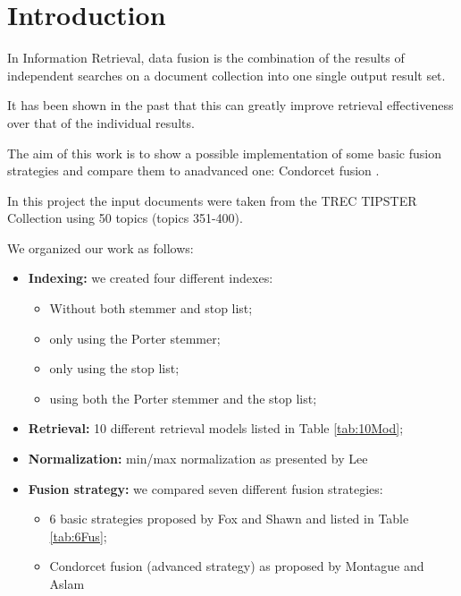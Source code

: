 


    \printTitle
    \newpage
    \tableofcontents
    \newpage

    \section{Introduction}
    
    In Information Retrieval, data fusion is the combination of the results
    of independent searches on a document collection into one single output
    result set.
    
    It has been shown in the past that this can greatly improve retrieval
    effectiveness over that of the individual results.
    
    The aim of this work is to show a possible implementation of some basic
    fusion strategies and compare them to anadvanced one: Condorcet fusion \cite{3}.

    In this project the input documents were taken from the TREC TIPSTER Collection using 50 topics (topics 351-400).
    
    We organized our work as follows:

    \begin{itemize}
        \item \textbf{Indexing:} we created four different indexes:
        \begin{itemize}
        	\item Without both stemmer and stop list;
        	\item only using the Porter stemmer;
        	\item only using the stop list;
        	\item using both the Porter stemmer and the stop list;
        \end{itemize}
        \item \textbf{Retrieval:} 10 different retrieval models listed in Table \ref{tab:10Mod};
		\item \textbf{Normalization:} min/max normalization as presented by Lee \cite{1}
        \item \textbf{Fusion strategy:} we compared seven different fusion strategies:
            \begin{itemize}
                \item 6 basic strategies proposed by Fox and Shawn \cite{2} and listed in Table \ref{tab:6Fus};
                \item Condorcet fusion (advanced strategy) as proposed by Montague and Aslam \cite{3}
            \end{itemize}
    \end{itemize}

